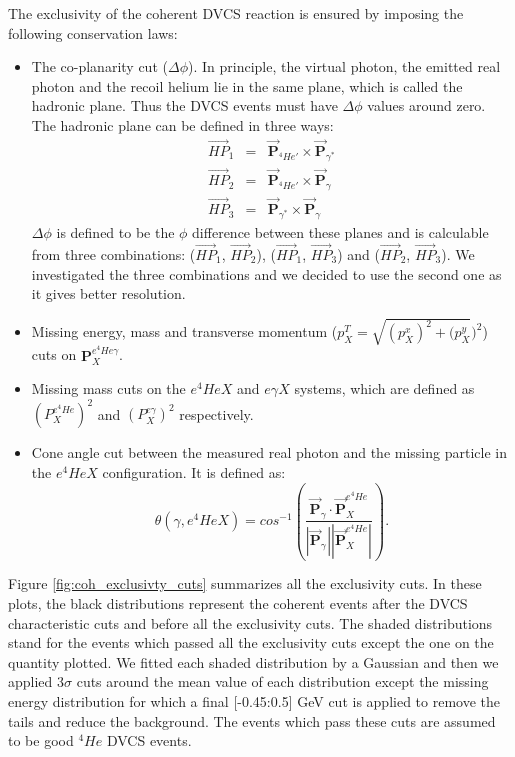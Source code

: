 The exclusivity of the coherent DVCS reaction is ensured by imposing the following conservation laws:
\begin{itemize}
\item The co-planarity cut ($\Delta \phi$). In principle, the virtual photon, the emitted real photon and the recoil helium lie in the same plane, which is called the hadronic plane. Thus the DVCS events must have $\Delta \phi$ values around zero. The hadronic plane can be defined in three ways:
\begin{eqnarray}
\overrightarrow{HP}_{1} &=& \overrightarrow{\mathbf{P}}_{^{4}He'} \times 
   \overrightarrow{\mathbf{P}}_{\gamma^{*}}\\
\overrightarrow{HP}_{2} &=& \overrightarrow{\mathbf{P}}_{^{4}He'}  \times 
   \overrightarrow{\mathbf{P}}_{\gamma}\\
\overrightarrow{HP}_{3} &=& \overrightarrow{\mathbf{P}}_{\gamma^{*}} \times 
   \overrightarrow{\mathbf{P}}_{\gamma}
\end{eqnarray}
$\Delta \phi$ is defined to be the $\phi$ difference between these planes and 
is calculable from three combinations: ($\overrightarrow{HP}_{1}$, 
$\overrightarrow{HP}_{2}$), ($\overrightarrow{HP}_{1}$, 
$\overrightarrow{HP}_{3}$) and ($\overrightarrow{HP}_{2}$, 
$\overrightarrow{HP}_{3}$). We investigated the three combinations and we 
decided to use the second one as it gives better resolution.

\item Missing energy, mass and transverse momentum ($p^{T}_{X} = 
   \sqrt{(p^{x}_{X})^2 + (p^{y}_{X}})^2$) cuts on 
   $\mathbf{P}^{e^{4}He\gamma}_{X}$.

\item Missing mass cuts on the $e^{4}HeX$ and $e\gamma X$ systems, which are 
   defined as $(P^{e^{4}He}_{X})^{2}$ and $(P^{e\gamma}_{X})^{2}$ respectively.

\item Cone angle cut between the measured real photon and the missing particle 
   in the $e^{4}HeX$ configuration. It is defined as:
\begin{equation}
\theta(\gamma, e^{4}HeX) = cos^{-1} \left( 
\frac{\overrightarrow{\mathbf{P}}_{\gamma} \cdot 
\overrightarrow{\mathbf{P}}^{e^{4}He}_{X}}{|\overrightarrow{\mathbf{P}}_{\gamma^{}}| 
|\overrightarrow{\mathbf{P}}^{e^{4}He}_{X}|}   \right).
\end{equation}
\end{itemize}
Figure \ref{fig:coh_exclusivty_cuts} summarizes all the exclusivity cuts.  In 
these plots, the black distributions represent the coherent events after the 
DVCS characteristic cuts and before all the exclusivity cuts. The shaded 
distributions stand for the events which passed all the exclusivity cuts except 
the one on the quantity plotted. We fitted each shaded distribution by a 
Gaussian and then we applied  3$\sigma$ cuts around the mean value of each 
distribution except the missing energy distribution for which a final 
[-0.45:0.5] GeV cut is applied to remove the tails and reduce the background.   
The events which pass these cuts are assumed to be good $^{4}He$ DVCS events. 

